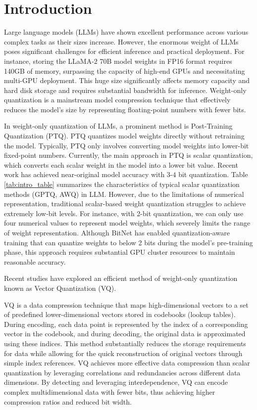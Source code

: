 \section{Introduction}


Large language models (LLMs) \cite{llama2, llama3} have shown excellent performance across various complex tasks as their sizes increase. 
However, the enormous weight of LLMs poses significant challenges for efficient inference and practical deployment. 
For instance, storing the LLaMA-2 70B model weights in FP16 format requires 140GB of memory, surpassing the capacity of high-end GPUs and necessitating multi-GPU deployment.
This huge size significantly affects memory capacity and hard disk storage and requires substantial bandwidth for inference. 
Weight-only quantization is a mainstream model compression technique that effectively reduces the model's size by representing floating-point numbers with fewer bits.





In weight-only quantization of LLMs, a prominent method is Post-Training Quantization (PTQ).
PTQ quantizes model weights directly without retraining the model. Typically, PTQ only involves converting model weights into lower-bit fixed-point numbers. 
Currently, the main approach in PTQ is scalar quantization, which converts each scalar weight in the model into a lower bit value. 
Recent work \citep{gptq, awq, SmoothQuant, owq, QuIP} has achieved near-original model accuracy with $3$-$4$ bit quantization.
Table \ref{tab:intro_table} summarizes the characteristics of typical scalar quantization methods (GPTQ, AWQ)  in LLM.
However, due to the limitations of numerical representation, traditional scalar-based weight quantization struggles to achieve extremely low-bit levels. 
For instance, with 2-bit quantization, we can only use four numerical values to represent model weights, which severely limits the range of weight representation. 
Although BitNet \citep{bitnet, bitnet158} has enabled quantization-aware training that can quantize weights to below 2 bits during the model's pre-training phase, this approach requires substantial GPU cluster resources to maintain reasonable accuracy.



Recent studies \citep{GPTVQ, QuIPsharp, AQLM} have explored an efficient method of weight-only quantization known as Vector Quantization (VQ). 

VQ is a data compression technique that maps high-dimensional vectors to a set of predefined lower-dimensional vectors stored in codebooks (lookup tables). During encoding, each data point is represented by the index of a corresponding vector in the codebook, and during decoding, the original data is approximated using these indices. 
This method substantially reduces the storage requirements for data while allowing for the quick reconstruction of original vectors through simple index references.
VQ achieves more effective data compression than scalar quantization by leveraging correlations and redundancies across different data dimensions.
By detecting and leveraging interdependence, VQ can encode complex multidimensional data with fewer bits, thus achieving higher compression ratios and reduced bit width.


